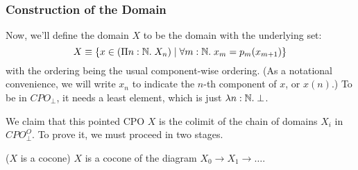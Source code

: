 \ \\

\subsubsection{Construction of the Domain}

Now, we'll define the domain $X$ to be the domain with the underlying set:
\begin{displaymath}
X \equiv \left\{ x \in (\Pi n:\mathbb{N}.\; X_n) \;|\; \forall m:\mathbb{N}.\; x_m = p_m(x_{m+1}) \right\}
\end{displaymath}
with the ordering being the usual component-wise ordering. (As a
notational convenience, we will write $x_n$ to indicate the $n$-th
component of $x$, or $x(n)$.)  To be in $CPO_\bot$, it needs a least
element, which is just $\lambda n:\mathbb{N}.\;\bot$.  

We claim that this pointed CPO $X$ is the colimit of the chain of
domains $X_i$ in $CPO_\bot^O$. To prove it, we must proceed in two
stages.

\begin{lemma}{($X$ is a cocone)} $X$ is a cocone of the
diagram $X_0 \longrightarrow X_1 \longrightarrow \ldots$. 
\end{lemma}


